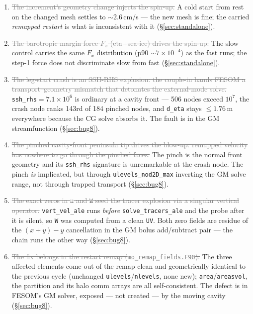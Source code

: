 \documentclass[11pt,a4paper]{article}
\newcommand{\code}[1]{\texttt{\small #1}}
\newcommand{\dead}[1]{\textcolor{gray}{\sout{#1}}}
\begin{document}
\begin{enumerate}
{  ice-base drag \code{C\_d\_cavity}.} At the stock drag, chunk-1 and \emph{both} year-long
  cold-start equilibria run at the healthy $\sim$2.6\,cm/s; the fast currents are injected by
  the mesh increment, not a drag deficit (\S\ref{sec:standalone}).
\item \dead{The increment's geometry change injects the spin-up.} A cold start from rest on the
  changed mesh settles to $\sim$2.6\,cm/s --- the new mesh is fine; the carried \emph{remapped
  restart} is what is inconsistent with it (\S\ref{sec:standalone}).
\item \dead{The barotropic margin force $F_x$ (eta$+$sea-ice) drives the spin-up.} The slow
  control carries the same $F_x$ distribution (p90 $\sim7\times10^{-4}$) as the fast runs; the
  step-1 force does not discriminate slow from fast (\S\ref{sec:standalone}).
\item \dead{The leg-start crash is an SSH-RHS explosion: the couple-in hands FESOM a
  transport--geometry mismatch that detonates the external-mode solve.} \code{ssh\_rhs}$=7.1\times10^6$
  is ordinary at a cavity front --- 506 nodes exceed $10^7$, the crash node ranks 143rd of 184 pinched
  nodes, and \code{d\_eta} stays $\le1.76$\,m everywhere because the CG solve absorbs it. The fault is
  in the GM streamfunction (\S\ref{sec:bug8}).
\item \dead{The pinched cavity-front peninsula tip drives the blow-up: remapped velocity has nowhere
  to go through the pinched faces.} The pinch is the normal front geometry and its \code{ssh\_rhs}
  signature is unremarkable at the crash node. The pinch \emph{is} implicated, but through
  \code{ulevels\_nod2D\_max} inverting the GM solve range, not through trapped transport
  (\S\ref{sec:bug8}).
\item \dead{The exact zeros in \code{u} and \code{W} seed the tracer explosion via a singular vertical
  operator.} \code{vert\_vel\_ale} runs \emph{before} \code{solve\_tracers\_ale} and the probe after it
  is silent, so \code{W} was computed from a clean \code{UV}. Both zero fields are residue of the
  $(x+y)-y$ cancellation in the GM bolus add/subtract pair --- the chain runs the other way
  (\S\ref{sec:bug8}).
\item \dead{The fix belongs in the restart remap (\code{mo\_remap\_fields.F90}).} The three affected
  elements come out of the remap clean and geometrically identical to the previous cycle (unchanged
  \code{ulevels}/\code{nlevels}, none new); \code{area}/\code{areasvol}, the partition and its halo
  comm arrays are all self-consistent. The defect is in FESOM's GM solver, exposed --- not created ---
  by the moving cavity (\S\ref{sec:bug8}).
\end{enumerate}
\end{document}
